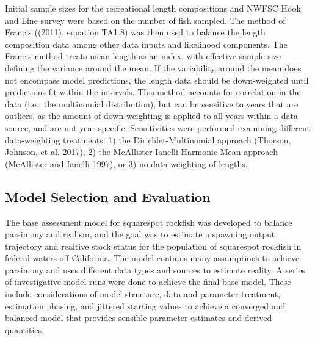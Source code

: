 \documentclass[11pt,
  english,
  a4paper,
]{article}
\begin{document}
\leavevmode\tagmcend\tagstructend\par


Initial sample sizes for the recreational length compositions and NWFSC Hook and Line survey were based on the number of fish sampled. The method of Francis ({(2011)\leavevmode\tagmcend\tagstructend}, equation TA1.8) was then used to balance the length composition data among other data inputs and likelihood components. The Francis method treats mean length as an index, with effective sample size defining the variance around the mean. If the variability around the mean does not encompass model predictions, the length data should be down-weighted until predictions fit within the intervals. This method accounts for correlation in the data (i.e., the multinomial distribution), but can be sensitive to years that are outliers, as the amount of down-weighting is applied to all years within a data source, and are not year-specific. Sensitivities were performed examining different data-weighting treatments: 1) the Dirichlet-Multinomial approach {(Thorson, Johnson, et al. 2017)\leavevmode\tagmcend\tagstructend}, 2) the McAllister-Ianelli Harmonic Mean approach {(McAllister and Ianelli 1997)\leavevmode\tagmcend\tagstructend}, or 3) no data-weighting of lengths.

\leavevmode\tagmcend\tagstructend\par


\hypertarget{model-selection-and-evaluation}{%
\subsection{Model Selection and Evaluation}\label{model-selection-and-evaluation}}

\leavevmode\tagmcend\tagstructend


The base assessment model for squarespot rockfish was developed to balance parsimony and realism, and the goal was to estimate a spawning output trajectory and realtive stock status for the population of squarespot rockfish in federal waters off California. The model contains many assumptions to achieve parsimony and uses different data types and sources to estimate reality. A series of investigative model runs were done to achieve the final base model. These include considerations of model structure, data and parameter treatment, estimation phasing, and jittered starting values to achieve a converged and balanced model that provides sensible parameter estimates and derived quantities.
\end{document}
